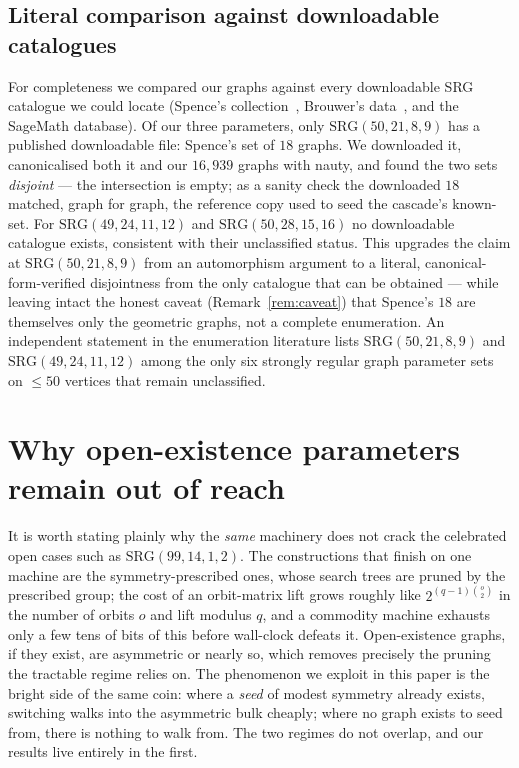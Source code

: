 \documentclass[11pt]{article}
\theoremstyle{definition}
\newcommand{\SRG}[1]{\mathrm{SRG}(#1)}
\begin{document}
\subsection{Literal comparison against downloadable catalogues}\label{sec:download}

For completeness we compared our graphs against every downloadable SRG catalogue we could
locate (Spence's collection~\cite{spence}, Brouwer's data~\cite{brouwer-table}, and the
SageMath database). Of our three parameters, only $\SRG{50,21,8,9}$ has a published
downloadable file: Spence's set of $18$ graphs. We downloaded it, canonicalised both it and
our $16{,}939$ graphs with nauty, and found the two sets \emph{disjoint} --- the intersection
is empty; as a sanity check the downloaded $18$ matched, graph for graph, the reference copy
used to seed the cascade's known-set. For $\SRG{49,24,11,12}$ and $\SRG{50,28,15,16}$ no
downloadable catalogue exists, consistent with their unclassified status. This upgrades the
claim at $\SRG{50,21,8,9}$ from an automorphism argument to a literal, canonical-form-verified
disjointness from the only catalogue that can be obtained --- while leaving intact the honest
caveat (Remark~\ref{rem:caveat}) that Spence's $18$ are themselves only the geometric graphs,
not a complete enumeration. An independent statement in the enumeration literature lists
$\SRG{50,21,8,9}$ and $\SRG{49,24,11,12}$ among the only six strongly regular graph parameter
sets on $\le 50$ vertices that remain unclassified.

\section{Why open-existence parameters remain out of reach}\label{sec:ironlaw}

It is worth stating plainly why the \emph{same} machinery does not crack the celebrated
open cases such as $\SRG{99,14,1,2}$. The constructions that finish on one machine are
the symmetry-prescribed ones, whose search trees are pruned by the prescribed group; the
cost of an orbit-matrix lift grows roughly like $2^{(q-1)\binom{o}{2}}$ in the number of
orbits $o$ and lift modulus $q$, and a commodity machine exhausts only a few tens of bits
of this before wall-clock defeats it. Open-existence graphs, if they exist, are
asymmetric or nearly so, which removes precisely the pruning the tractable regime relies
on. The phenomenon we exploit in this paper is the bright side of the same coin: where a
\emph{seed} of modest symmetry already exists, switching walks into the asymmetric bulk
cheaply; where no graph exists to seed from, there is nothing to walk from. The two
regimes do not overlap, and our results live entirely in the first.
\end{document}
